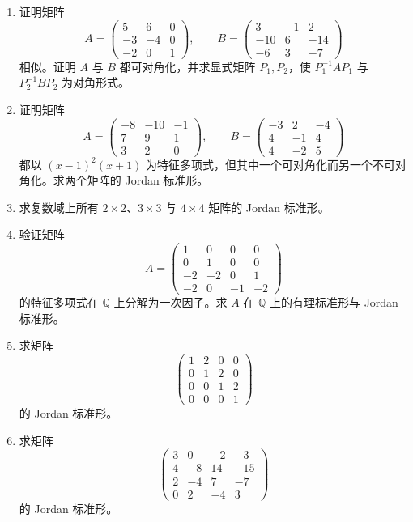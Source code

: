 \begin{enumerate}[label=\arabic*.]
\item 证明矩阵
\[
A=\begin{pmatrix}5&6&0\\-3&-4&0\\-2&0&1\end{pmatrix},
\qquad
B=\begin{pmatrix}3&-1&2\\-10&6&-14\\-6&3&-7\end{pmatrix}
\]
相似。证明 $A$ 与 $B$ 都可对角化，并求显式矩阵 $P_1,P_2$，使 $P_1^{-1}AP_1$ 与 $P_2^{-1}BP_2$ 为对角形式。

\item 证明矩阵
\[
A=\begin{pmatrix}-8&-10&-1\\7&9&1\\3&2&0\end{pmatrix},
\qquad
B=\begin{pmatrix}-3&2&-4\\4&-1&4\\4&-2&5\end{pmatrix}
\]
都以 $(x-1)^2(x+1)$ 为特征多项式，但其中一个可对角化而另一个不可对角化。求两个矩阵的 Jordan 标准形。

\item 求复数域上所有 $2\times2$、$3\times3$ 与 $4\times4$ 矩阵的 Jordan 标准形。

\item 验证矩阵
\[
A=\begin{pmatrix}
1&0&0&0\\
0&1&0&0\\
-2&-2&0&1\\
-2&0&-1&-2
\end{pmatrix}
\]
的特征多项式在 $\mathbb Q$ 上分解为一次因子。求 $A$ 在 $\mathbb Q$ 上的有理标准形与 Jordan 标准形。

\item 求矩阵
\[
\begin{pmatrix}
1&2&0&0\\
0&1&2&0\\
0&0&1&2\\
0&0&0&1
\end{pmatrix}
\]
的 Jordan 标准形。

\item 求矩阵
\[
\begin{pmatrix}
3&0&-2&-3\\
4&-8&14&-15\\
2&-4&7&-7\\
0&2&-4&3
\end{pmatrix}
\]
的 Jordan 标准形。


\end{enumerate}
